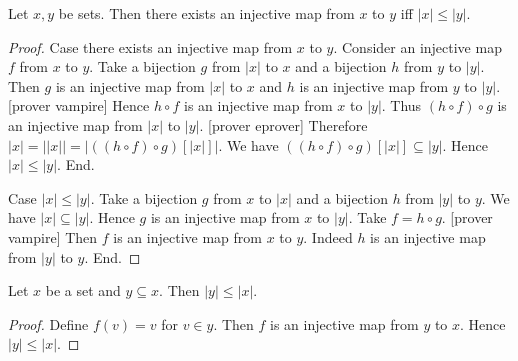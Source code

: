 \documentclass[../set-theory.tex]{subfiles}
\begin{document}
  \begin{forthel}
    \begin{proposition}
      Let $x, y$ be sets.
      Then there exists an injective map from $x$ to $y$ iff $|x| \leq |y|$.
    \end{proposition}
    \begin{proof}
      Case there exists an injective map from $x$ to $y$.
        Consider an injective map $f$ from $x$ to $y$.
        Take a bijection $g$ from $|x|$ to $x$ and a bijection $h$ from $y$ to
        $|y|$.
        Then $g$ is an injective map from $|x|$ to $x$ and $h$ is an injective
        map from $y$ to $|y|$.
        [prover vampire]
        Hence $h \circ f$ is an injective map from $x$ to $|y|$.
        Thus $(h \circ f) \circ g$ is an injective map from $|x|$ to $|y|$.
        [prover eprover]
        Therefore $|x|
          = ||x||
          = |((h \circ f) \circ g)[|x|]|$.
        We have $((h \circ f) \circ g)[|x|] \subseteq |y|$.
        Hence $|x| \leq |y|$.
      End.

      Case $|x| \leq |y|$.
        Take a bijection $g$ from $x$ to $|x|$ and a bijection $h$ from $|y|$ to
        $y$.
        We have $|x| \subseteq |y|$.
        Hence $g$ is an injective map from $x$ to $|y|$.
        Take $f = h \circ g$.
        [prover vampire]
        Then $f$ is an injective map from $x$ to $y$.
        Indeed $h$ is an injective map from $|y|$ to $y$.
      End.
    \end{proof}
  \end{forthel}

  \begin{forthel}
    \begin{corollary}
      Let $x$ be a set and $y \subseteq x$.
      Then $|y| \leq |x|$.
    \end{corollary}
    \begin{proof}
      Define $f(v) = v$ for $v \in y$.
      Then $f$ is an injective map from $y$ to $x$.
      Hence $|y| \leq |x|$.
    \end{proof}
  \end{forthel}
\end{document}
